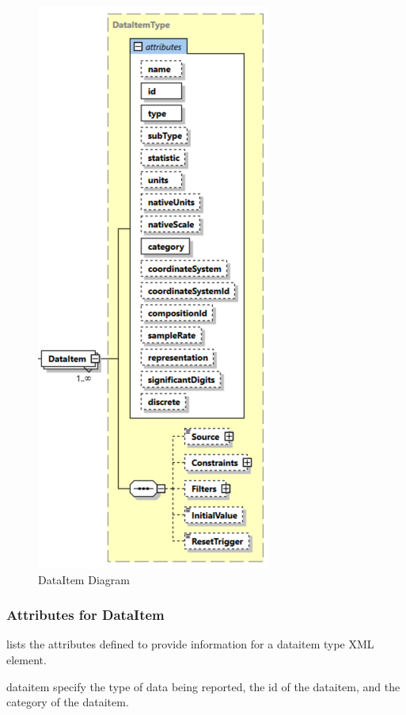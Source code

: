\documentclass{mtconnect}	%
\begin{document}
\begin{figure}[ht]
  \centering
  \includegraphics[width=.45\textwidth]{figures/dataitem-schema-diagram.png}
  \caption{DataItem Diagram}
  \label{fig:dataitem-schema-diagram}
\end{figure}
\FloatBarrier

\subsubsection{Attributes for DataItem}
\label{sec:Attributes for DataItem}

 lists the attributes defined to provide information for a \gls{dataitem} type XML element.  

\gls{dataitem} \must specify the type of data being reported, the id of the \gls{dataitem}, and the \gls{category} of the \gls{dataitem}.  
\end{document}
